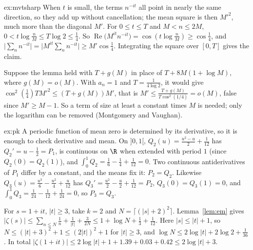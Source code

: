 \begin{solution}{ex:mvtsharp}
\idea When $t$ is small, the terms $n^{-it}$ all point in nearly the same direction, so they add up without cancellation; the mean square is then $M'^2$, much more than the diagonal $M'$.
\writeup For $0\le t\le T$ and $M<n\le2M$, $0<t\log\frac nM\le T\log2\le\frac14$. So $\operatorname{Re}\bigl(M^{it}n^{-it}\bigr)=\cos(t\log\frac nM)\ge\cos\frac14$, and $\bigl|\sum_nn^{-it}\bigr|=\bigl|M^{it}\sum_nn^{-it}\bigr|\ge M'\cos\frac14$. Integrating the square over $[0,T]$ gives the claim.

Suppose the lemma held with $T+g(M)$ in place of $T+8M(1+\log M)$, where $g(M)=o(M)$. With $a_n=1$ and $T=\frac1{4\log2}$, it would give $\cos^2(\frac14)TM'^2\le(T+g(M))M'$, that is $M'\le\frac{T+g(M)}{T\cos^2(1/4)}=o(M)$, false since $M'\ge M-1$. So a term of size at least a constant times $M$ is needed; only the logarithm can be removed (Montgomery and Vaughan).
\end{solution}

\begin{solution}{ex:pk}
\idea A periodic function of mean zero is determined by its derivative, so it is enough to check derivative and mean.
\writeup On $]0,1[$, $Q_2(u)=\frac{u^2-u}2+\frac1{12}$ has $Q_2'=u-\frac12=P_1$, is continuous on $\R$ when extended with period $1$ (since $Q_2(0)=Q_2(1)$), and $\int_0^1Q_2=\frac16-\frac14+\frac1{12}=0$. Two continuous antiderivatives of $P_1$ differ by a constant, and the means fix it: $P_2=Q_2$. Likewise
$Q_3(u)=\frac{u^3}6-\frac{u^2}4+\frac u{12}$ has $Q_3'=\frac{u^2}2-\frac u2+\frac1{12}=P_2$, $Q_3(0)=Q_3(1)=0$, and $\int_0^1Q_3=\frac1{24}-\frac1{12}+\frac1{24}=0$, so $P_3=Q_3$.

For $s=1+it$, $|t|\ge3$, take $k=2$ and $N=\lceil(|s|+2)^2\rceil$. Lemma~\ref{lem:em} gives $|\zeta(s)|\le\sum_{n\le N}\frac1n+\frac1{|t|}+\frac3{2N}\le1+\log N+\frac13+\frac1{12}$. Here $|s|\le|t|+1$, so $N\le(|t|+3)^2+1\le(2|t|)^2+1$ for $|t|\ge3$, and $\log N\le2\log|t|+2\log2+\frac1{36}$. In total $|\zeta(1+it)|\le2\log|t|+1+1.39+0.03+0.42\le2\log|t|+3$.
\end{solution}

